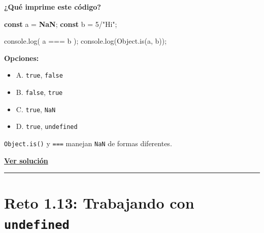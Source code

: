 \documentclass[
  letterpaper,
  DIV=11,
  numbers=noendperiod]{scrreprt}
\newenvironment{Shaded}{\begin{snugshade}}{\end{snugshade}}
\newcommand{\BuiltInTok}[1]{\textcolor[rgb]{0.00,0.23,0.31}{#1}}
\newcommand{\DecValTok}[1]{\textcolor[rgb]{0.68,0.00,0.00}{#1}}
\newcommand{\FunctionTok}[1]{\textcolor[rgb]{0.28,0.35,0.67}{#1}}
\newcommand{\KeywordTok}[1]{\textcolor[rgb]{0.00,0.23,0.31}{\textbf{#1}}}
\newcommand{\NormalTok}[1]{\textcolor[rgb]{0.00,0.23,0.31}{#1}}
\newcommand{\OperatorTok}[1]{\textcolor[rgb]{0.37,0.37,0.37}{#1}}
\newcommand{\StringTok}[1]{\textcolor[rgb]{0.13,0.47,0.30}{#1}}
\providecommand{\tightlist}{%
  \setlength{\itemsep}{0pt}\setlength{\parskip}{0pt}}
\begin{document}
\textbf{¿Qué imprime este código?}

\begin{Shaded}
\begin{Highlighting}[]
\KeywordTok{const}\NormalTok{ a }\OperatorTok{=} \KeywordTok{NaN}\OperatorTok{;}
\KeywordTok{const}\NormalTok{ b }\OperatorTok{=} \DecValTok{5}\OperatorTok{/}\StringTok{"Hi"}\OperatorTok{;}

\BuiltInTok{console}\OperatorTok{.}\FunctionTok{log}\NormalTok{( a }\OperatorTok{===}\NormalTok{ b )}\OperatorTok{;} 
\BuiltInTok{console}\OperatorTok{.}\FunctionTok{log}\NormalTok{(}\BuiltInTok{Object}\OperatorTok{.}\FunctionTok{is}\NormalTok{(a}\OperatorTok{,}\NormalTok{ b))}\OperatorTok{;} 
\end{Highlighting}
\end{Shaded}

\textbf{Opciones:}

\begin{itemize}
\tightlist
\item
  A. \texttt{true}, \texttt{false}
\item
  B. \texttt{false}, \texttt{true}
\item
  C. \texttt{true}, \texttt{NaN}
\item
  D. \texttt{true}, \texttt{undefined}
\end{itemize}

\begin{tcolorbox}[enhanced jigsaw, left=2mm, toprule=.15mm, leftrule=.75mm, breakable, colback=white, coltitle=black, bottomtitle=1mm, arc=.35mm, rightrule=.15mm, colframe=quarto-callout-tip-color-frame, opacitybacktitle=0.6, toptitle=1mm, opacityback=0, titlerule=0mm, title=\textcolor{quarto-callout-tip-color}{\faLightbulb}\hspace{0.5em}{Pista}, bottomrule=.15mm, colbacktitle=quarto-callout-tip-color!10!white]

\texttt{Object.is()} y \texttt{===} manejan \texttt{NaN} de formas
diferentes.

\end{tcolorbox}

\textbf{\hyperref[sec-sol-cap1-reto12]{Ver solución}}

\begin{center}\rule{0.5\linewidth}{0.5pt}\end{center}

\section{\texorpdfstring{Reto 1.13: Trabajando con
\texttt{undefined}}{Reto 1.13: Trabajando con undefined}}\label{sec-cap1-reto13}
\end{document}
